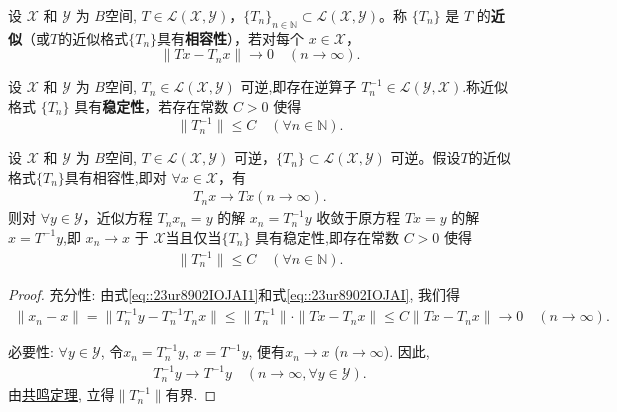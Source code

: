 \documentclass[../../main.tex]{subfiles}%
\begin{document}
\begin{definition}[相容性]
设 $\mathscr{X} $ 和 $\mathscr{Y} $ 为 $B$空间, $T\in\mathscr{L} (\mathscr{X} ,\mathscr{Y} )$，$\{T_n\}_{n\in\mathbb{N}}\subset\mathscr{L} (\mathscr{X} ,\mathscr{Y} )$。称 $\{T_n\}$ 是 $T$ 的\textbf{近似}（或$T$的近似格式$\{T_n\}$具有\textbf{相容性}），若对每个 $x\in\mathscr{X} $，
\[
\|Tx - T_nx\| \to 0 \quad (n\to\infty).
\]
\end{definition}

\begin{definition}[稳定性]
设 $\mathscr{X} $ 和 $\mathscr{Y} $ 为 $B$空间,  $T_n\in\mathscr{L} (\mathscr{X} ,\mathscr{Y} )$ 可逆,即存在逆算子 $T_n^{-1}\in\mathscr{L} (\mathscr{Y} ,\mathscr{X} )$.称近似格式 $\{T_n\}$ 具有\textbf{稳定性}，若存在常数 $C>0$ 使得
\[
\|T_n^{-1}\| \leqslant C \quad (\forall n\in\mathbb{N}).
\]
\end{definition}

\begin{theorem}[Lax定理]\label{theorem:泛函分析--Lax定理}
设 $\mathscr{X} $ 和 $\mathscr{Y} $ 为 $B$空间,  $T\in\mathscr{L} (\mathscr{X} ,\mathscr{Y} )$ 可逆，$\{T_n\}\subset\mathscr{L} (\mathscr{X} ,\mathscr{Y} )$ 可逆。假设$T$的近似格式$\{T_n\}$具有相容性,即对 $\forall x\in\mathscr{X} $，有
\begin{align}\label{eq::23ur8902IOJAI1}
T_nx\to Tx(n\to \infty).
\end{align}
则对 $\forall y\in\mathscr{Y} $，近似方程 $T_nx_n=y$ 的解 $x_n = T_n^{-1}y$ 收敛于原方程 $Tx=y$ 的解 $x = T^{-1}y$,即 $x_n\to x$ 于 $\mathscr{X} $当且仅当$\{T_n\}$ 具有稳定性,即存在常数 $C>0$ 使得
\begin{align}
\|T_n^{-1}\| \leqslant C \quad (\forall n\in\mathbb{N}).\label{eq::23ur8902IOJAI}
\end{align}
\end{theorem}
\begin{proof}

{\heiti 充分性:} 由式\eqref{eq::23ur8902IOJAI1}和式\eqref{eq::23ur8902IOJAI}, 我们得
\begin{align*}
\|x_n - x\| = \|T_n^{-1}y - T_n^{-1}T_nx\| 
\leqslant \|T_n^{-1}\| \cdot \|Tx - T_nx\| 
\leqslant C\|Tx - T_nx\| \to 0 \quad (n\to\infty).
\end{align*}

{\heiti 必要性:} $\forall y\in\mathscr{Y}$, 令$x_n=T_n^{-1}y$, $x=T^{-1}y$, 便有$x_n\to x$ ($n\to\infty$). 因此,
\begin{align*}
T_n^{-1}y \to T^{-1}y \quad (n\to\infty, \forall y\in\mathscr{Y}).
\end{align*}
由\hyperref[theorem:泛函分析--共鸣定理]{共鸣定理}, 立得$\|T_n^{-1}\|$有界.

\end{proof}
\end{document}
